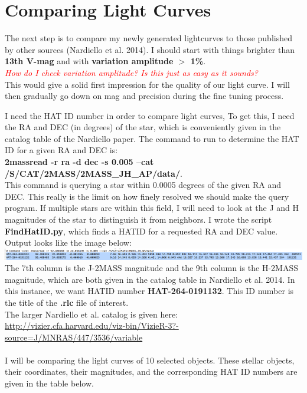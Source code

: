 \documentclass[11pt,letterpaper]{book} %
\begin{document}
\section*{Comparing Light Curves}
The next step is to compare my newly generated lightcurves to those published by other sources (Nardiello et al. 2014). 
I should start with things brighter than \textbf{13th V-mag} and with \textbf{variation amplitude $>$ 1\%}.\\ \textcolor{red}{\textit{How do I check variation amplitude? Is this just as easy as it sounds?}}\\
This would give a solid first impression for the quality of our light curve. 
I will then gradually go down on mag and precision during the fine tuning process. 

I need the HAT ID number in order to compare light curves, To get this, I need the RA and DEC (in degrees) of the star, which is conveniently given in the catalog table of the Nardiello paper.
The command to run to determine the HAT ID for a given RA and DEC is: \\ 
\textbf{2massread -r ra -d dec -s 0.005 --cat /S/CAT/2MASS/2MASS\_JH\_AP/data/}.\\
This command is querying a star within 0.0005 degrees of the given RA and DEC. This really is the limit on how finely resolved we should make the query program. If multiple stars are within this field, I will need to look at the J and H magnitudes of the star to distinguish it from neighbors. 
I wrote the script \textbf{FindHatID.py}, which finds a HATID for a requested RA and DEC value. 
Output looks like the image below: \\
\includegraphics[width=\textwidth]{HATID.png}\\
The 7th column is the J-2MASS magnitude and the 9th column is the H-2MASS magnitude, which are both given in the catalog table in Nardiello et al. 2014. In this instance, we want HATID number \textbf{HAT-264-0191132}. This ID number is the title of the \textbf{.rlc} file of interest.\\
The larger Nardiello et al. catalog is given here:\\
\url{http://vizier.cfa.harvard.edu/viz-bin/VizieR-3?-source=J/MNRAS/447/3536/variable}\\ \\ 
I will be comparing the light curves of 10 selected objects. These stellar objects, their coordinates, their magnitudes, and the corresponding HAT ID numbers are given in the table below.
\end{document}

